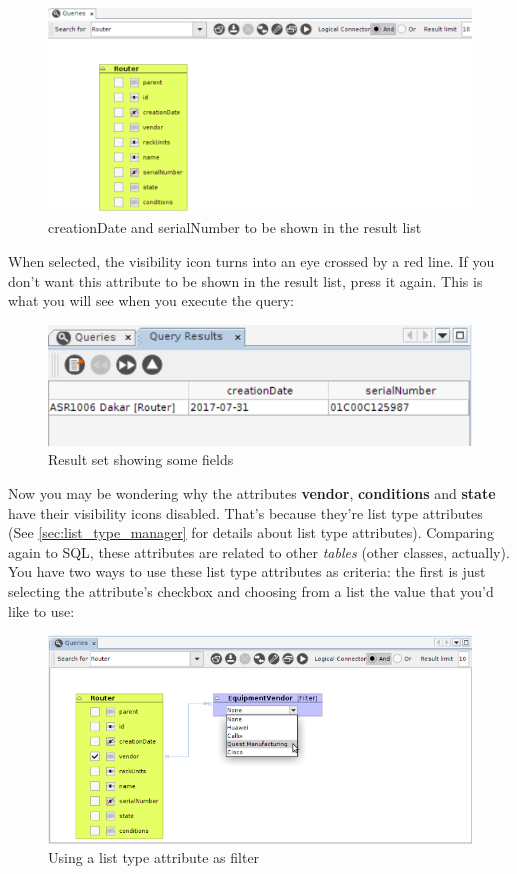 \documentclass[a4paper]{article}
\begin{document}
	\begin{figure}[h!]
		\centering
		\includegraphics[width=0.9\linewidth]{img/query_node_attributes_selected.png}
		\caption{creationDate and serialNumber to be shown in the result list}
		\label{fig:query_node_attributes_selected}
	\end{figure}
	
	When selected, the visibility icon turns into an eye crossed by a red line. If you don't want this attribute to be shown in the result list, press it again. This is what you will see when you execute the query:
	
	\begin{figure}[h!]
		\centering
		\includegraphics[width=0.6\linewidth]{img/query_results_attributes_selected.png}
		\caption{Result set showing some fields}
		\label{fig:query_results_attributes_selected}
	\end{figure}
	
	Now you may be wondering why the attributes \textbf{vendor}, \textbf{conditions} and \textbf{state} have their visibility icons disabled. That's because they're list type attributes (See \ref{sec:list_type_manager} for details about list type attributes).  Comparing again to SQL, these attributes are related to other \textit{tables} (other classes, actually). You have two ways to use these list type attributes as criteria: the first is just selecting the attribute's checkbox and choosing from a list the value that you'd like to use:
	\begin{figure}[h!]
		\centering
		\includegraphics[width=0.9\linewidth]{img/query_vendor_selected.png}
		\caption{Using a list type attribute as filter}
		\label{fig:query_vendor_selected}
	\end{figure}
	
\end{document}

